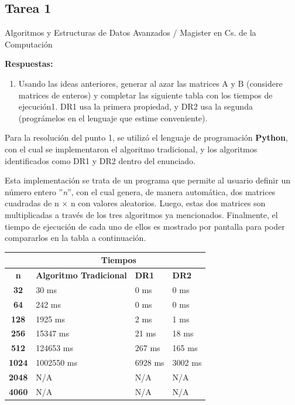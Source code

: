 \documentclass[12pt]{report}
\begin{document}
  \begin{center}
    \section*{Tarea 1}
    
    Algoritmos y Estructuras de Datos Avanzados / Magister en Cs. de la Computación
  \end{center}
  
  \textbf{Respuestas:}
  
  \begin{enumerate}
    \item Usando las ideas anteriores, generar al azar las
    matrices A y B (considere matrices de enteros) y
    completar las siguiente tabla con los tiempos de
    ejecución1. DR1 usa la primera propiedad, y DR2
    usa la segunda (prográmelos en el lenguaje que
    estime conveniente).
  \end{enumerate}
  
  Para la resolución del punto 1, se utilizó el lenguaje de programación \textbf{Python}, con el cual se implementaron el algoritmo tradicional, y los algoritmos identificados como DR1 y DR2 dentro del enunciado.
  
  Esta implementación se trata de un programa que permite al usuario definir un número entero ''\textit{n}'', con el cual genera, de manera automática, dos matrices cuadradas de n × n con valores aleatorios. Luego, estas dos matrices son multiplicadas a través de los tres algoritmos ya mencionados. Finalmente, el tiempo de ejecución de cada uno de ellos es mostrado por pantalla para poder compararlos en la tabla a continuación.
  
  \begin{center}
    \begin{tabular}{ | c | p{5.5cm} | p{3.5cm} | p{3.5cm} |}
      \hline
      {} & \multicolumn{3}{|c|}{\textbf{Tiempos}} \\
      \hline
      \textbf{n} & {\textbf{Algoritmo Tradicional}} & {\textbf{DR1}} & {\textbf{DR2}}\\ \hline
      {\textbf{32}} & 30 ms & 0 ms & 0 ms \\ \hline
      {\textbf{64}} & 242 ms & 0 ms & 0 ms \\ \hline
      {\textbf{128}} & 1925 ms & 2 ms & 1 ms \\ \hline
      {\textbf{256}} & 15347 ms & 21 ms & 18 ms \\ \hline
      {\textbf{512}} & 124653 ms & 267 ms & 165 ms \\ \hline
      {\textbf{1024}} & 1002550 ms & 6928 ms & 3002 ms \\ \hline
      {\textbf{2048}} & N/A & N/A & N/A \\ \hline
      {\textbf{4060}} & N/A & N/A & N/A \\ \hline
    \end{tabular}
  \end{center}
  
\end{document}
